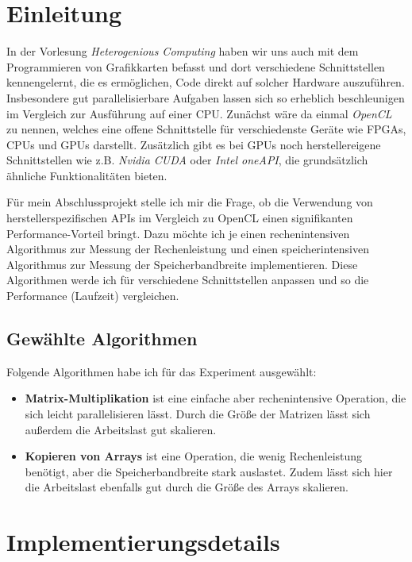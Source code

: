 \documentclass[12pt]{article}
\date{}
\begin{document}
	\section*{Einleitung}
	In der Vorlesung \emph{Heterogenious Computing} haben wir uns auch mit dem Programmieren von Grafikkarten befasst und dort verschiedene Schnittstellen kennengelernt, die es ermöglichen, Code direkt auf solcher Hardware auszuführen.
	Insbesondere gut parallelisierbare Aufgaben lassen sich so erheblich beschleunigen im Vergleich zur Ausführung auf einer CPU.
	Zunächst wäre da einmal \emph{OpenCL} zu nennen, welches eine offene Schnittstelle für verschiedenste Geräte wie FPGAs, CPUs und GPUs darstellt.
	Zusätzlich gibt es bei GPUs noch herstellereigene Schnittstellen wie z.B. \emph{Nvidia CUDA} oder \emph{Intel oneAPI}, die grundsätzlich ähnliche Funktionalitäten bieten.
	
	Für mein Abschlussprojekt stelle ich mir die Frage, ob die Verwendung von herstellerspezifischen APIs im Vergleich zu OpenCL einen signifikanten Performance-Vorteil bringt.
	Dazu möchte ich je einen rechenintensiven Algorithmus zur Messung der Rechenleistung und einen speicherintensiven Algorithmus zur Messung der Speicherbandbreite implementieren.
	Diese Algorithmen werde ich für verschiedene Schnittstellen anpassen und so die Performance (Laufzeit) vergleichen.
	
	\subsection*{Gewählte Algorithmen}
	Folgende Algorithmen habe ich für das Experiment ausgewählt:
	
	\begin{itemize}
		\item \textbf{Matrix-Multiplikation} ist eine einfache aber rechenintensive Operation, die sich leicht parallelisieren lässt. Durch die Größe der Matrizen lässt sich außerdem die Arbeitslast gut skalieren.
		\item \textbf{Kopieren von Arrays} ist eine Operation, die wenig Rechenleistung benötigt, aber die Speicherbandbreite stark auslastet. Zudem lässt sich hier die Arbeitslast ebenfalls gut durch die Größe des Arrays skalieren.
	\end{itemize}
	
	\section*{Implementierungsdetails}
\end{document}

